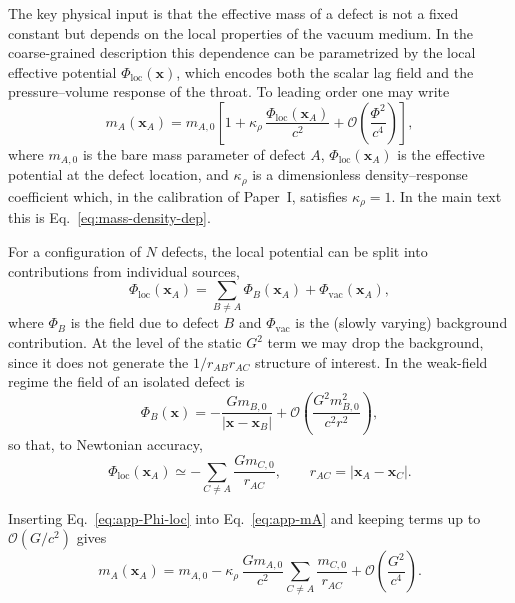 \documentclass[11pt]{article}
\begin{document}
The key physical input is that the effective mass of a defect is not
a fixed constant but depends on the local properties of the vacuum
medium.
In the coarse-grained description this dependence can be parametrized
by the local effective potential $\Phi_{\text{loc}}(\mathbf{x})$,
which encodes both the scalar lag field and the pressure--volume
response of the throat.
To leading order one may write
\begin{equation}
  m_A(\mathbf{x}_A)
  = m_{A,0}\left[
      1 + \kappa_\rho\,
          \frac{\Phi_{\text{loc}}(\mathbf{x}_A)}{c^2}
      + \mathcal{O}\!\left(\frac{\Phi^2}{c^4}\right)
    \right],
  \label{eq:app-mA}
\end{equation}
where $m_{A,0}$ is the bare mass parameter of defect $A$,
$\Phi_{\text{loc}}(\mathbf{x}_A)$ is the effective potential at the
defect location, and $\kappa_\rho$ is a dimensionless
density–response coefficient which, in the calibration of Paper~I,
satisfies $\kappa_\rho=1$.
In the main text this is Eq.~\eqref{eq:mass-density-dep}.

For a configuration of $N$ defects, the local potential can be
split into contributions from individual sources,
\begin{equation}
  \Phi_{\text{loc}}(\mathbf{x}_A)
  = \sum_{B\neq A} \Phi_{B}(\mathbf{x}_A)
    + \Phi_{\text{vac}}(\mathbf{x}_A),
\end{equation}
where $\Phi_{B}$ is the field due to defect $B$ and
$\Phi_{\text{vac}}$ is the (slowly varying) background contribution.
At the level of the static $G^2$ term we may drop the background,
since it does not generate the $1/r_{AB}r_{AC}$ structure of
interest.
In the weak-field regime the field of an isolated defect is
\begin{equation}
  \Phi_{B}(\mathbf{x})
  = -\frac{G m_{B,0}}{|\mathbf{x}-\mathbf{x}_B|}
  + \mathcal{O}\!\left(\frac{G^2 m_{B,0}^2}{c^2 r^2}\right),
\end{equation}
so that, to Newtonian accuracy,
\begin{equation}
  \Phi_{\text{loc}}(\mathbf{x}_A)
  \simeq -\sum_{C\neq A}
          \frac{G m_{C,0}}{r_{AC}},
  \qquad
  r_{AC} = |\mathbf{x}_A-\mathbf{x}_C|.
  \label{eq:app-Phi-loc}
\end{equation}

Inserting Eq.~\eqref{eq:app-Phi-loc} into Eq.~\eqref{eq:app-mA} and
keeping terms up to $\mathcal{O}(G/c^2)$ gives
\begin{equation}
  m_A(\mathbf{x}_A)
  = m_{A,0}
    - \kappa_\rho\,
      \frac{G m_{A,0}}{c^2}
      \sum_{C\neq A}
      \frac{m_{C,0}}{r_{AC}}
    + \mathcal{O}\!\left(\frac{G^2}{c^4}\right).
  \label{eq:app-mA-expanded}
\end{equation}
\end{document}
